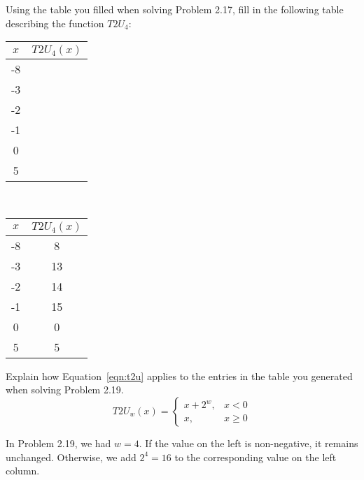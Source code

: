 \documentclass[12pt]{article}
\newenvironment{ex}[2][Exercise]{\begin{trivlist}
		\item[\hskip \labelsep {\bfseries #1}\hskip \labelsep {\bfseries #2.}]}{\end{trivlist}}
\newenvironment{sol}[1][Solution]{\begin{trivlist}
		\item[\hskip \labelsep {\bfseries #1:}]}{\end{trivlist}}
\begin{document}
\begin{ex}{2.19}
	Using the table you filled when solving Problem 2.17, fill in the following table describing
	the function $T2U_4$:
	\begin{center}
		\begin{tabular}{cc}
			$x$ & $T2U_4(x)$\\
			\hline
			-8 & \makebox[1cm]{\hrulefill}\\
			-3 & \makebox[1cm]{\hrulefill}\\
			-2 & \makebox[1cm]{\hrulefill}\\
			-1 & \makebox[1cm]{\hrulefill}\\
			 0 & \makebox[1cm]{\hrulefill}\\
			 5 & \makebox[1cm]{\hrulefill}
		\end{tabular}
	\end{center}
\end{ex}

\begin{sol}
	\
	\begin{center}
		\begin{tabular}{cc}
			$x$ & $T2U_4(x)$\\
			\hline
			-8 & 8\\
			-3 & 13\\
			-2 & 14\\
			-1 & 15\\
			0 & 0\\
			5 & 5
		\end{tabular}
	\end{center}
\end{sol}

\begin{ex}{2.20}
	Explain how Equation~\ref{eqn:t2u} applies to the entries in the table you generated when
	solving Problem 2.19.
	\begin{equation}\label{eqn:t2u}
		T2U_w(x)=\begin{cases}
			x + 2^w, & x < 0\\
			x,       & x\geq 0
		\end{cases}
	\end{equation}
\end{ex}

\begin{sol}
	In Problem 2.19, we had $w=4$. If the value on the left is non-negative, it remains unchanged.
	Otherwise, we add $2^4=16$ to the corresponding value on the left column.
\end{sol}
\end{document}
